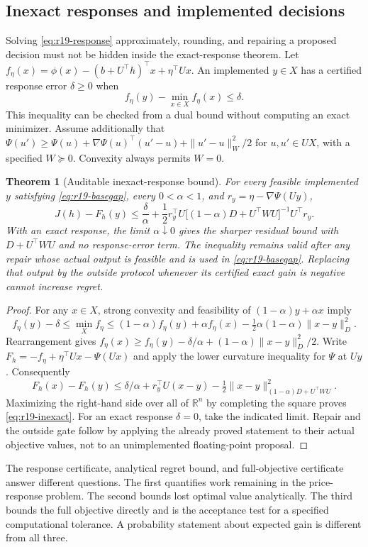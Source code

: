 \documentclass[11pt,letterpaper]{article}
\newtheorem{theorem}{Theorem}[section]
\theoremstyle{definition}
\newcommand{\1}{\mathbf 1}
\begin{document}
\subsection{Inexact responses and implemented decisions}
Solving \eqref{eq:r19-response} approximately, rounding, and repairing a proposed decision must not be hidden inside the exact-response theorem. Let
$f_\eta(x)=\phi(x)-(b+U^\top h)^\top x+\eta^\top Ux$.
An implemented $y\in X$ has a certified response error $\delta\geq0$ when
\begin{equation}\label{eq:r19-basegap}
 f_\eta(y)-\min_{x\in X}f_\eta(x)\leq\delta.
\end{equation}
This inequality can be checked from a dual bound without computing an exact minimizer. Assume additionally that
$\Psi(u')\geq\Psi(u)+\nabla\Psi(u)^\top(u'-u)+\|u'-u\|_W^2/2$
for $u,u'\in UX$, with a specified $W\succeq0$. Convexity always permits $W=0$.

\begin{theorem}[Auditable inexact-response bound]\label{thm:r19-inexact}
For every feasible implemented $y$ satisfying \eqref{eq:r19-basegap}, every $0<\alpha<1$, and $r_y=\eta-\nabla\Psi(Uy)$,
\begin{equation}\label{eq:r19-inexact}
 J(h)-F_h(y)\leq\frac{\delta}{\alpha}
 +\frac12r_y^\top U\big[(1-\alpha)D+U^\top WU\big]^{-1}U^\top r_y.
\end{equation}
With an exact response, the limit $\alpha\downarrow0$ gives the sharper residual bound with $D+U^\top WU$ and no response-error term. The inequality remains valid after any repair whose \emph{actual output} is feasible and is used in \eqref{eq:r19-basegap}. Replacing that output by the outside protocol whenever its certified exact gain is negative cannot increase regret.
\end{theorem}
\begin{proof}
For any $x\in X$, strong convexity and feasibility of $(1-\alpha)y+\alpha x$ imply
\[
 f_\eta(y)-\delta\leq\min_X f_\eta
 \leq(1-\alpha)f_\eta(y)+\alpha f_\eta(x)
 -\tfrac12\alpha(1-\alpha)\|x-y\|_D^2.
\]
Rearrangement gives
$f_\eta(x)\geq f_\eta(y)-\delta/\alpha+(1-\alpha)\|x-y\|_D^2/2$.
Write $F_h=-f_\eta+\eta^\top Ux-\Psi(Ux)$ and apply the lower curvature inequality for $\Psi$ at $Uy$. Consequently
\[
 F_h(x)-F_h(y)\leq\delta/\alpha+r_y^\top U(x-y)
 -\tfrac12\|x-y\|_{(1-\alpha)D+U^\top WU}^2.
\]
Maximizing the right-hand side over all of $\mathbb R^n$ by completing the square proves \eqref{eq:r19-inexact}. For an exact response $\delta=0$, take the indicated limit. Repair and the outside gate follow by applying the already proved statement to their actual objective values, not to an unimplemented floating-point proposal.
\end{proof}
The response certificate, analytical regret bound, and full-objective certificate answer different questions. The first quantifies work remaining in the price-response problem. The second bounds lost optimal value analytically. The third bounds the full objective directly and is the acceptance test for a specified computational tolerance. A probability statement about expected gain is different from all three.
\end{document}
